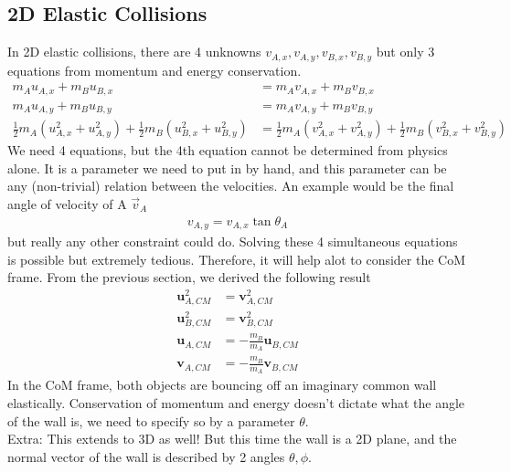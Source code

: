 \documentclass{article}
\begin{document}
\subsection{2D Elastic Collisions}
In 2D elastic collisions, there are 4 unknowns $v_{A,x}, v_{A,y}, v_{B,x}, v_{B,y}$ but only 3 equations from momentum and energy conservation.
\begin{align}
m_A u_{A,x} + m_B u_{B,x} &= m_A v_{A,x} + m_B v_{B,x} \\
m_A u_{A,y} + m_B u_{B,y} &= m_A v_{A,y} + m_B v_{B,y} \\
    \frac{1}{2} m_A (u_{A,x}^2 + u_{A,y}^2) + \frac{1}{2} m_B (u_{B,x}^2 + u_{B,y}^2) 
 &= \frac{1}{2} m_A (v_{A,x}^2 + v_{A,y}^2) + \frac{1}{2} m_B (v_{B,x}^2 + v_{B,y}^2) 
\end{align}
We need 4 equations, but the 4th equation cannot be determined from physics alone. It is a parameter we need to put in by hand, and this parameter can be any (non-trivial) relation between the velocities. An example would be the final angle of velocity of A $\vec{v}_{A}$
\begin{align}
    v_{A,y} = v_{A,x} \tan \theta_A
\end{align}
but really any other constraint could do. Solving these 4 simultaneous equations is possible but extremely tedious. Therefore, it will help alot to consider the CoM frame. From the previous section, we derived the following result
\begin{align}
    \mathbf{u}_{A,CM}^2 &= \mathbf{v}_{A,CM}^2 \\ 
    \mathbf{u}_{B,CM}^2 &= \mathbf{v}_{B,CM}^2 \\ 
    \mathbf{u}_{A,CM} &= -\frac{m_B}{m_A} \mathbf{u}_{B,CM}\\
    \mathbf{v}_{A,CM} &= -\frac{m_B}{m_A} \mathbf{v}_{B,CM}
\end{align}
In the CoM frame, both objects are bouncing off an imaginary common wall elastically. Conservation of momentum and energy doesn't dictate what the angle of the wall is, we need to specify so by a parameter $\theta$. \\[10pt]
Extra: This extends to 3D as well! But this time the wall is a 2D plane, and the normal vector of the wall is described by 2 angles $\theta,\phi$.\\[10pt]
\end{document}
